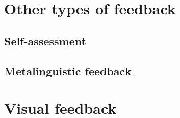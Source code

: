 	\section{Other types of feedback}
		\subsection{Self-assessment}
		\subsection{Metalinguistic feedback}


\section{}

\section{Visual feedback}
\label{sec:fb:visual}

	
